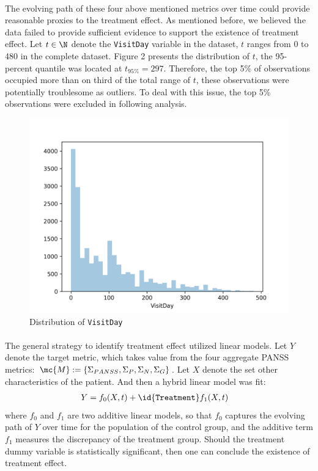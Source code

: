 \documentclass[11pt]{article}
\begin{document}
	\paragraph{}The evolving path of these four above mentioned metrics over time could provide reasonable proxies to the treatment effect. As mentioned before, we believed the data failed to provide sufficient evidence to support the existence of treatment effect. Let $t \in \N$ denote the \texttt{VisitDay} variable in the dataset, $t$ ranges from 0 to 480 in the complete dataset. Figure 2 presents the distribution of $t$, the 95-percent quantile was located at $t_{95\%} = 297$. Therefore, the top 5\% of observations occupied more than on third of the total range of $t$, these observations were potentially troublesome as outliers. To deal with this issue, the top 5\% observations were excluded in following analysis.

	\begin{figure}[H]
		\centering
		\includegraphics[width=0.7\linewidth]{figures/dist_visit_day_all.png}
		\caption{Distribution of \texttt{VisitDay}}
	\end{figure}
	
	\paragraph{}The general strategy to identify treatment effect utilized linear models. Let $Y$ denote the target metric, which takes value from the four aggregate PANSS metrics: $\mc{M} := \{ \Sigma_{PANSS}, \Sigma_P, \Sigma_N, \Sigma_G\}$. Let $X$ denote the set other characteristics of the patient. And then a hybrid linear model was fit:
	\begin{align}
		Y &= f_0(X, t) + \id{\texttt{Treatment}} f_1(X, t)
	\end{align}
	where $f_0$ and $f_1$ are two additive linear models, so that $f_0$ captures the evolving path of $Y$ over time for the population of the control group, and the additive term $f_1$ measures the discrepancy of the treatment group.
	Should the treatment dummy variable is statistically significant, then one can conclude the existence of treatment effect.
\end{document}
